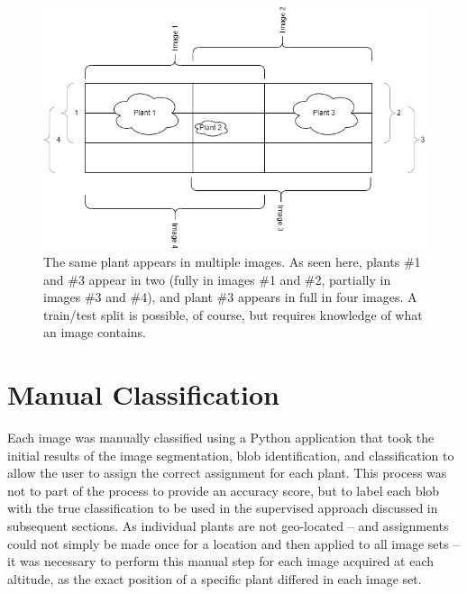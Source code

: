 \documentclass[letterpaper]{article}
\begin{document}
{\begin{figure}[h!]
	\centering
	\includegraphics[width=0.5\linewidth]{./figures/overlap.png}
	\caption[Image overlap in UAV images]{The same plant appears in multiple images. As seen here, plants \#1 and \#3 appear in two (fully in images \#1 and \#2, partially in images \#3 and \#4), and plant \#3 appears in full in four images. A train/test split is possible, of course, but requires knowledge of what an image contains.}
	\label{fig:uav-overlap}
\end{figure}

	
%
%
\section{Manual Classification}
Each image was manually classified using a Python application that took the initial results of the image segmentation, blob identification, and classification to allow the user to assign the correct assignment for each plant. This process was not to part of the process to provide an accuracy score, but to label each blob with the true classification to be used in the supervised approach discussed in subsequent sections. As individual plants are not geo-located -- and assignments could not simply be made once for a location and then applied to all image sets -- it was necessary to perform this manual step for each image acquired at each altitude, as the exact position of a specific plant differed in each image set.

}
\end{document}

